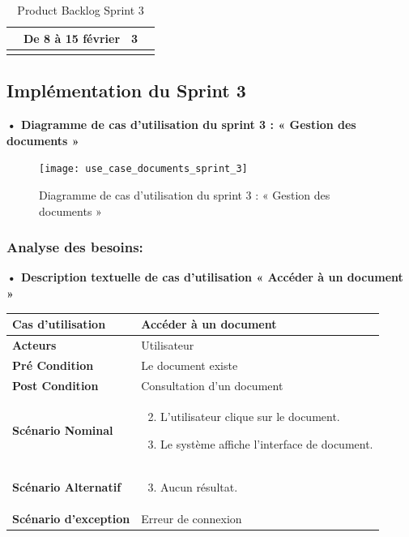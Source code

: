 \begin{longtable}{|p{4cm}|p{7cm}|p{2cm}|p{2cm}|}
\begin{itemize}
  \end{itemize}
  &
  De 8 à 15 février  
  &
  3
  \\
  \hline
  \caption{Product Backlog Sprint 3}
  \label{tab:product_backlog_sprint_3}



\end{longtable}


\subsection{Implémentation du Sprint 3}
\textbf{•	Diagramme de cas d'utilisation du sprint 3 : « Gestion des documents »}

\begin{figure}[H]
  \centering
  \texttt{[image: use\_case\_documents\_sprint\_3]}
  \caption{Diagramme de cas d'utilisation du sprint 3 : « Gestion des documents »}
  \label{fig:UseCaseDiagramSprint3}
\end{figure}


\subsubsection{Analyse des besoins:}
\textbf{•	Description textuelle de cas d'utilisation « Accéder à un document »}

\begin{longtable}{|p{5cm}|p{10cm}|}
\hline
\textbf{Cas d'utilisation}&Accéder à un document\\
\hline
\textbf{Acteurs}&Utilisateur\\
\hline
\textbf{Pré Condition}&Le document existe\\
\hline
\textbf{Post Condition}&Consultation d'un document\\
\hline
\textbf{Scénario Nominal}&
\vspace{-\baselineskip}
\begin{enumerate}
    \setcounter{enumi}{1}
    \item L'utilisateur clique sur le document.
    \item Le système affiche l'interface de document.
    
\end{enumerate}\\
\hline
\textbf{Scénario Alternatif}&
\vspace{-\baselineskip}
\begin{enumerate}
    \setcounter{enumi}{2}
    \item Aucun résultat.
\end{enumerate}\\
\hline
\textbf{Scénario d'exception}&Erreur de connexion\\
\hline
\end{longtable}


